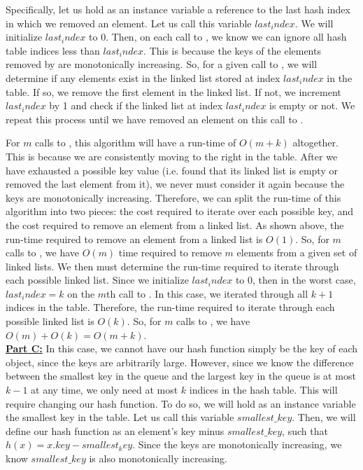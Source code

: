 \documentclass[11pt]{article}
\begin{document}
Specifically, let us hold as an instance variable a reference to the last hash index in which we removed an element. Let us call this variable $last_index$. We will initialize $last_index$ to 0. Then, on each call to , we know we can ignore all hash table indices less than $last_index$. This is because the keys of the elements removed by  are monotonically increasing. So, for a given call to , we will determine if any elements exist in the linked list stored at index $last_index$ in the table. If so, we remove the first element in the linked list. If not, we increment $last_index$ by 1 and check if the linked list at index $last_index$ is empty or not. We repeat this process until we have removed an element on this call to .

For $m$ calls to , this algorithm will have a run-time of $O(m+k)$ altogether. This is because we are consistently moving to the right in the table. After we have exhausted a possible key value (i.e. found that its linked list is empty or removed the last element from it), we never must consider it again because the keys are monotonically increasing. Therefore, we can split the run-time of this algorithm into two pieces: the cost required to iterate over each possible key, and the cost required to remove an element from a linked list. As shown above, the run-time required to remove an element from a linked list is $O(1)$. So, for $m$ calls to , we have $O(m)$ time required to remove $m$ elements from a given set of linked lists. We then must determine the run-time required to iterate through each possible linked list. Since we initialize $last_index$ to 0, then in the worst case, $last_index = k$ on the $m$th call to . In this case, we iterated through all $k+1$ indices in the table. Therefore, the run-time required to iterate through each possible linked list is $O(k)$. So, for $m$ calls to , we have $O(m) + O(k) = O(m+k)$.\\

\textbf{\underline{Part C:}} In this case, we cannot have our hash function simply be the key of each object, since the keys are arbitrarily large. However, since we know the difference between the smallest key in the queue and the largest key in the queue is at most $k-1$ at any time, we only need at most $k$ indices in the hash table. This will require changing our hash function. To do so, we will hold as an instance variable the smallest key in the table. Let us call this variable $smallest\_key$. Then, we will define our hash function as an element's key minus $smallest\_key$, such that $h(x) = x.key - smallest_key$. Since the keys are monotonically increasing, we know $smallest\_key$ is also monotonically increasing.
\end{document}
